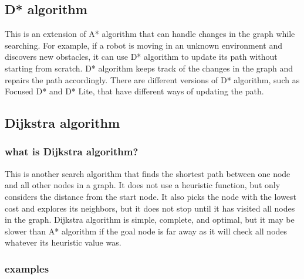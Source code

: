 \documentclass{article}
\begin{document}
\subsection {D* algorithm}
	This is an extension of A* algorithm that can handle changes in the graph while searching. For example, if a robot is moving in an unknown environment and discovers new obstacles, it can use D* algorithm to update its path without starting from scratch. D* algorithm keeps track of the changes in the graph and repairs the path accordingly. There are different versions of D* algorithm, such as Focused D* and D* Lite, that have different ways of updating the path.

\subsection {Dijkstra algorithm}

\subsubsection{what is Dijkstra algorithm?}
\tab This is another search algorithm that finds the shortest path between one node and all other nodes in a graph. It does not use a heuristic function, but only considers the distance from the start node. It also picks the node with the lowest cost and explores its neighbors, but it does not stop until it has visited all nodes in the graph. Dijkstra algorithm is simple, complete, and optimal, but it may be slower than A* algorithm if the goal node is far away as it will check all nodes whatever its heuristic value was. 

\subsubsection{examples}
\end{document}
